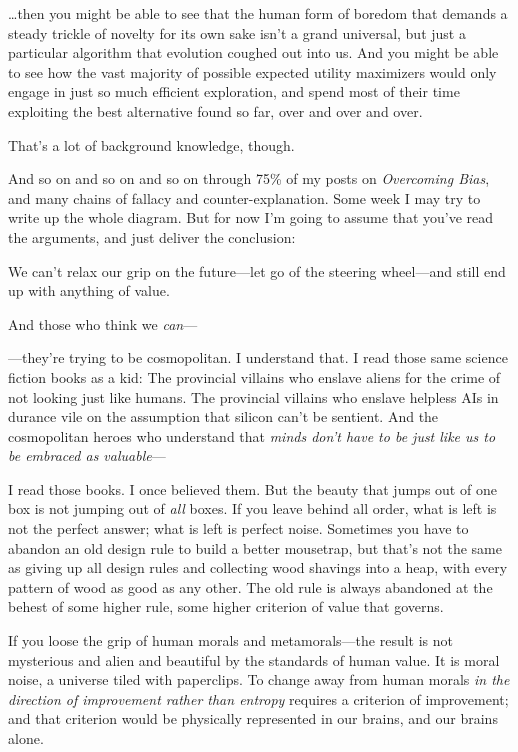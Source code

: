 {
 \ldots then you might be able to see that the human form of boredom
that demands a steady trickle of novelty for its own sake
isn't a grand universal, but just a particular
algorithm that evolution coughed out into us. And you might be able to
see how the vast majority of possible expected utility maximizers would
only engage in just so much efficient exploration, and spend most of
their time exploiting the best alternative found so far, over and over
and over.}

{
 That's a lot of background knowledge, though.}

{
 And so on and so on and so on through 75\% of my posts on
\textit{Overcoming Bias}, and many chains of fallacy and
counter-explanation. Some week I may try to write up the whole diagram.
But for now I'm going to assume that
you've read the arguments, and just deliver the
conclusion:}

{
 We can't relax our grip on the future---let go of
the steering wheel---and still end up with anything of value.}

{
 And those who think we \textit{can}{}---}

{
 {}---they're trying to be cosmopolitan. I
understand that. I read those same science fiction books as a kid: The
provincial villains who enslave aliens for the crime of not looking
just like humans. The provincial villains who enslave helpless AIs in
durance vile on the assumption that silicon can't be
sentient. And the cosmopolitan heroes who understand that \textit{minds
don't have to be just like us to be embraced as
valuable}{}---}

{
 I read those books. I once believed them. But the beauty that
jumps out of one box is not jumping out of \textit{all} boxes. If you
leave behind all order, what is left is not the perfect answer; what is
left is perfect noise. Sometimes you have to abandon an old design rule
to build a better mousetrap, but that's not the same as
giving up all design rules and collecting wood shavings into a heap,
with every pattern of wood as good as any other. The old rule is always
abandoned at the behest of some higher rule, some higher criterion of
value that governs.}

{
 If you loose the grip of human morals and metamorals---the result
is not mysterious and alien and beautiful by the standards of human
value. It is moral noise, a universe tiled with paperclips. To change
away from human morals \textit{in the direction of improvement rather
than entropy} requires a criterion of improvement; and that criterion
would be physically represented in our brains, and our brains alone.}

